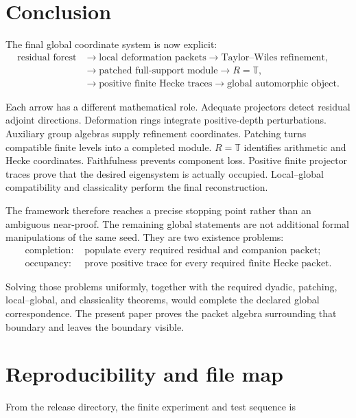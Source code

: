 \documentclass[11pt]{article}
\theoremstyle{definition}
\theoremstyle{remark}
\newcommand{\T}{\mathbb T}
\begin{document}
\section{Conclusion}

The final global coordinate system is now explicit:
\[
\boxed{
\begin{aligned}
\text{residual forest}
&\longrightarrow
\text{local deformation packets}
\longrightarrow
\text{Taylor--Wiles refinement},\\
&\longrightarrow
\text{patched full-support module}
\longrightarrow
R=\T,\\
&\longrightarrow
\text{positive finite Hecke traces}
\longrightarrow
\text{global automorphic object}.
\end{aligned}}
\]

Each arrow has a different mathematical role.  Adequate projectors detect residual adjoint directions.  Deformation rings integrate positive-depth perturbations.  Auxiliary group algebras supply refinement coordinates.  Patching turns compatible finite levels into a completed module.  $R=\T$ identifies arithmetic and Hecke coordinates.  Faithfulness prevents component loss.  Positive finite projector traces prove that the desired eigensystem is actually occupied.  Local--global compatibility and classicality perform the final reconstruction.

The framework therefore reaches a precise stopping point rather than an ambiguous near-proof.  The remaining global statements are not additional formal manipulations of the same seed.  They are two existence problems:
\[
\boxed{
\begin{aligned}
\text{completion: }&
\text{populate every required residual and companion packet};\\
\text{occupancy: }&
\text{prove positive trace for every required finite Hecke packet}.
\end{aligned}}
\]

Solving those problems uniformly, together with the required dyadic, patching, local--global, and classicality theorems, would complete the declared global correspondence.  The present paper proves the packet algebra surrounding that boundary and leaves the boundary visible.

\appendix
\section{Reproducibility and file map}

From the release directory, the finite experiment and test sequence is
\end{document}
